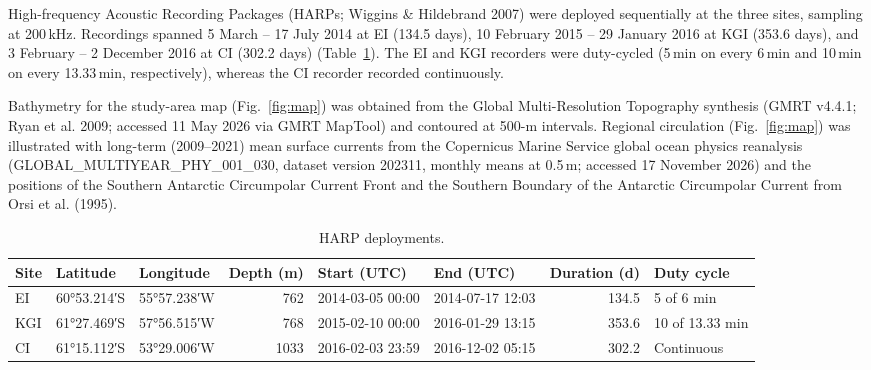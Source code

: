 \documentclass[11pt]{article}
\newcommand{\unit}[1]{\,#1}
\begin{document}
High-frequency Acoustic Recording Packages (HARPs; Wiggins \& Hildebrand 2007) were deployed sequentially at the three sites, sampling at 200\unit{kHz}. Recordings spanned 5 March -- 17 July 2014 at EI (134.5 days), 10 February 2015 -- 29 January 2016 at KGI (353.6 days), and 3 February -- 2 December 2016 at CI (302.2 days) (Table~\ref{tab:deploy}). The EI and KGI recorders were duty-cycled (5\unit{min} on every 6\unit{min} and 10\unit{min} on every 13.33\unit{min}, respectively), whereas the CI recorder recorded continuously.

Bathymetry for the study-area map (Fig.~\ref{fig:map}) was obtained from the Global Multi-Resolution Topography synthesis (GMRT v4.4.1; Ryan et al. 2009; accessed 11 May 2026 via GMRT MapTool) and contoured at 500-m intervals. Regional circulation (Fig.~\ref{fig:map}) was illustrated with long-term (2009--2021) mean surface currents from the Copernicus Marine Service global ocean physics reanalysis (GLOBAL\_MULTIYEAR\_PHY\_001\_030, dataset version 202311, monthly means at 0.5\unit{m}; accessed 17 November 2026) and the positions of the Southern Antarctic Circumpolar Current Front and the Southern Boundary of the Antarctic Circumpolar Current from Orsi et al. (1995).

\begin{table}[htbp]
\centering\small
\caption{HARP deployments.}
\label{tab:deploy}
\begin{tabular}{lllrllrl}
\toprule
Site & Latitude & Longitude & Depth (m) & Start (UTC) & End (UTC) & Duration (d) & Duty cycle \\
\midrule
EI  & 60°53.214′S & 55°57.238′W & 762  & 2014-03-05 00:00 & 2014-07-17 12:03 & 134.5 & 5 of 6 min \\
KGI & 61°27.469′S & 57°56.515′W & 768  & 2015-02-10 00:00 & 2016-01-29 13:15 & 353.6 & 10 of 13.33 min \\
CI  & 61°15.112′S & 53°29.006′W & 1033 & 2016-02-03 23:59 & 2016-12-02 05:15 & 302.2 & Continuous \\
\bottomrule
\end{tabular}
\end{table}
\end{document}
